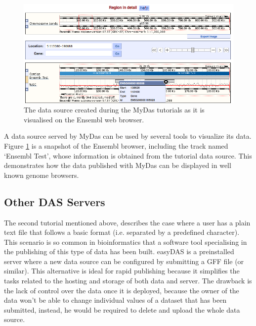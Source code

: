 \begin{figure}[t]
\centering
\includegraphics[width=\textwidth]{figures/MyDasEnsembl.png}
\caption[A MyDas Source as displayed on the Ensembl client.] {The data source created during the MyDas tutorials as it is visualised on the Ensembl web browser.
\label{fig:mydas_example}}
\end{figure}

A data source served by MyDas can be used by several tools to visualize its data. Figure \ref{fig:mydas_example} is a snapshot of the Ensembl browser, including the track named `Ensembl Test', whose information is obtained from the tutorial data source. This demonstrates how the data published with MyDas can be displayed in well known genome browsers.

\subsection{Other DAS Servers}
The second tutorial mentioned above, describes the case where a user has a plain text file that follows a basic format (i.e. separated by a predefined character). This scenario is so common in bioinformatics that a software tool specialising in the publishing of this type of data has been built. easyDAS\cite{GEL2011}  is a preinstalled server where a new data source can be configured by submitting a GFF file (or similar). This alternative is ideal for rapid publishing because it simplifies the tasks related to the hosting and storage of both data and server. The drawback is the lack of control over the data once it is deployed, because the owner of the data won't be able to change individual values of a dataset that has been submitted, instead, he would be required to delete and upload the whole data source.

